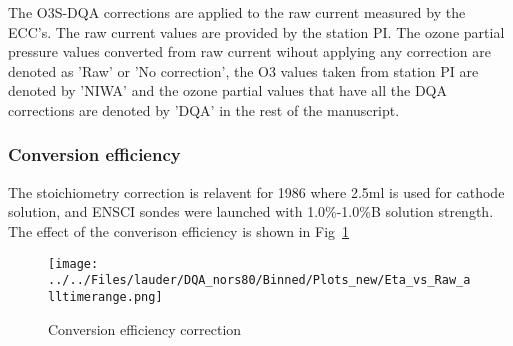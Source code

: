 The O3S-DQA corrections are applied to the raw current measured by the ECC's. The raw current values are provided by the station PI.
The ozone partial pressure values converted from raw current
wihout applying any correction are denoted as 'Raw' or 'No correction', the O3 values taken from station PI are denoted
by 'NIWA' and the ozone partial values that have all the DQA corrections
are denoted by 'DQA' in the rest of the manuscript.


    \subsubsection{Conversion efficiency}
 The stoichiometry correction is relavent for 1986 where 2.5ml is used for cathode solution, and ENSCI sondes were launched
    with 1.0\%-1.0\%B solution strength. The effect of the converison efficiency is shown in Fig~\ref{fig:eta}



                \begin{figure}
        \centering
\texttt{[image: ../../Files/lauder/DQA\_nors80/Binned/Plots\_new/Eta\_vs\_Raw\_alltimerange.png]}
    \caption{Conversion efficiency correction}
            \label{fig:eta}
    \end{figure}

%
%
